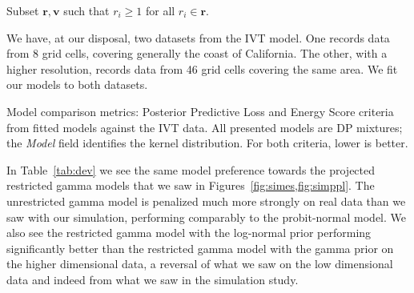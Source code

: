 \begin{algorithm}
  \label{algo:processing}
  Subset $\bm{ r},\bm{ v}$ such that $r_i \geq 1$ for all $r_i\in \bm{r}$.\\
\end{algorithm}

We have, at our disposal, two datasets from the IVT model.  One records data from 8 grid cells, covering
  generally the coast of California.  The other, with a higher resolution, records data from 46 grid
  cells covering the same area.  We fit our models to both datasets.

\begin{table}[h]
  \label{tab:dev}
  
  \caption{Model comparison metrics: Posterior Predictive Loss and Energy Score criteria from fitted
    models against the IVT data.  All presented models are DP mixtures; the \emph{Model} field
    identifies the kernel distribution.  For both criteria, lower is better.}
\end{table}

In Table~\ref{tab:dev} we see the same model preference towards the projected restricted gamma models
  that we saw in Figures~\ref{fig:simes,fig:simppl}.  The unrestricted gamma model is penalized much
  more strongly on real data than we saw with our simulation, performing comparably to the probit-normal
  model.  We also see the restricted gamma model with the log-normal prior performing significantly
  better than the restricted gamma model with the gamma prior on the higher dimensional data, a reversal
  of what we saw on the low dimensional data and indeed from what we saw in the simulation study.

